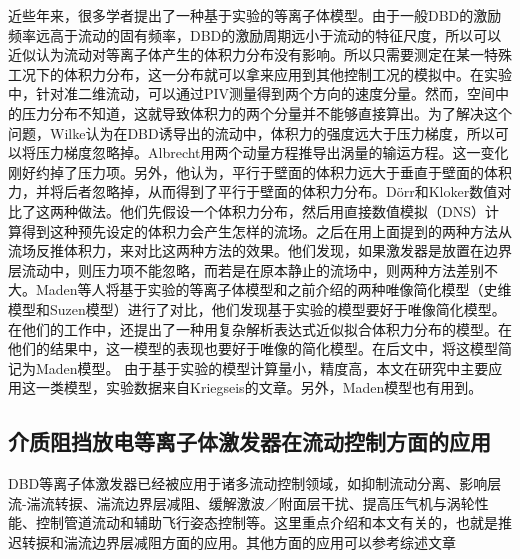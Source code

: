 近些年来，很多学者提出了一种基于实验的等离子体模型\cite{albrecht2011method,Kotsonis2011,kriegseis2013velocity,Benard2014,wilke2009aerodynamische}。由于一般DBD的激励频率远高于流动的固有频率，DBD的激励周期远小于流动的特征尺度，所以可以近似认为流动对等离子体产生的体积力分布没有影响。所以只需要测定在某一特殊工况下的体积力分布，这一分布就可以拿来应用到其他控制工况的模拟中。在实验中，针对准二维流动，可以通过PIV测量得到两个方向的速度分量。然而，空间中的压力分布不知道，这就导致体积力的两个分量并不能够直接算出。为了解决这个问题，Wilke\cite{wilke2009aerodynamische}认为在DBD诱导出的流动中，体积力的强度远大于压力梯度，所以可以将压力梯度忽略掉。Albrecht\cite{albrecht2011method}用两个动量方程推导出涡量的输运方程。这一变化刚好约掉了压力项。另外，他认为，平行于壁面的体积力远大于垂直于壁面的体积力，并将后者忽略掉，从而得到了平行于壁面的体积力分布。D\"orr和Kloker\cite{dorr2015numerical}数值对比了这两种做法。他们先假设一个体积力分布，然后用直接数值模拟（DNS）计算得到这种预先设定的体积力会产生怎样的流场。之后在用上面提到的两种方法从流场反推体积力，来对比这两种方法的效果。他们发现，如果激发器是放置在边界层流动中，则压力项不能忽略，而若是在原本静止的流场中，则两种方法差别不大。Maden等人\cite{Maden2013}将基于实验的等离子体模型和之前介绍的两种唯像简化模型（史维模型\cite{shyy2002}和Suzen模型\cite{suzen2007}）进行了对比，他们发现基于实验的模型要好于唯像简化模型。在他们的工作中，还提出了一种用复杂解析表达式近似拟合体积力分布的模型。在他们的结果中，这一模型的表现也要好于唯像的简化模型。在后文中，将这模型简记为Maden模型。 由于基于实验的模型计算量小，精度高，本文在研究中主要应用这一类模型，实验数据来自Kriegseis\cite{kriegseis2013velocity}的文章。另外，Maden模型也有用到。

\subsection{介质阻挡放电等离子体激发器在流动控制方面的应用}
DBD等离子体激发器已经被应用于诸多流动控制领域，如抑制流动分离\cite{Benard2016a,Sujar-Garrido2015,Benard2011,Benard2011a,Benard2016b,Little2010,Schneck2014,Jukes2009}、影响层流-湍流转捩\cite{Duchmann2014,Grundmann2007a,Grundmann2008,Kurz2014,Kotsonis2013,Hanson2010,Hanson2014}、湍流边界层减阻\cite{Jukes2006,Jukes2009,Mahfoze2017}、缓解激波／附面层干扰\cite{Im2012,Peschke2013}、提高压气机与涡轮性能\cite{huang2006,Ness2012}、控制管道流动\cite{Benard2008}和辅助飞行姿态控制\cite{He2009,Wei2013bang}等。这里重点介绍和本文有关的，也就是推迟转捩和湍流边界层减阻方面的应用。其他方面的应用可以参考综述文章\cite{Corke2010,wang2013Recent,wuyun2015}

